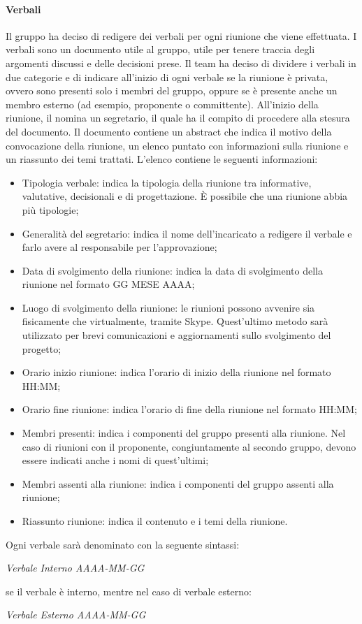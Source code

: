 			\paragraph{Verbali}
			Il gruppo ha deciso di redigere dei verbali per ogni riunione che viene effettuata. I verbali sono un documento utile al gruppo, utile per tenere traccia degli argomenti discussi e delle decisioni prese. Il team ha deciso di dividere i verbali in due categorie e di indicare all'inizio di ogni verbale se la riunione è privata, ovvero sono presenti solo i membri del gruppo, oppure se è presente anche un membro esterno (ad esempio, proponente o committente). All'inizio della riunione, il \textit{\RdP} nomina un segretario, il quale ha il compito di procedere alla stesura del documento. Il documento contiene un abstract che indica il motivo della convocazione della riunione, un elenco puntato con informazioni sulla riunione e un riassunto dei temi trattati. L'elenco contiene le seguenti informazioni:
			\begin{itemize}
				\item Tipologia verbale: indica la tipologia della riunione tra informative, valutative, decisionali e di progettazione. \MakeUppercase{è} possibile che una riunione abbia più tipologie;
				\item Generalità del segretario: indica il nome dell'incaricato a redigere il verbale e farlo avere al responsabile per l'approvazione;
				\item Data di svolgimento della riunione: indica la data di svolgimento della riunione nel formato GG MESE AAAA;
				\item Luogo di svolgimento della riunione: le riunioni possono avvenire sia fisicamente che virtualmente, tramite Skype. Quest'ultimo metodo sarà utilizzato per brevi comunicazioni e aggiornamenti sullo svolgimento del progetto;
				\item Orario inizio riunione: indica l'orario di inizio della riunione nel formato HH:MM;
				\item Orario fine riunione: indica l'orario di fine della riunione nel formato HH:MM;
				\item Membri presenti: indica i componenti del gruppo presenti alla riunione. Nel caso di riunioni con il proponente, congiuntamente al secondo gruppo, devono essere indicati anche i nomi di quest'ultimi;
				\item Membri assenti alla riunione: indica i componenti del gruppo assenti alla riunione;
				\item Riassunto riunione: indica il contenuto e i temi della riunione.
			\end{itemize}
			Ogni verbale sarà denominato con la seguente sintassi:
			\begin{center}
				\textit{Verbale Interno AAAA-MM-GG}
			\end{center} 
			se il verbale è interno, mentre nel caso di verbale esterno:
			\begin{center}
				\textit{Verbale Esterno AAAA-MM-GG}
			\end{center} 
			
